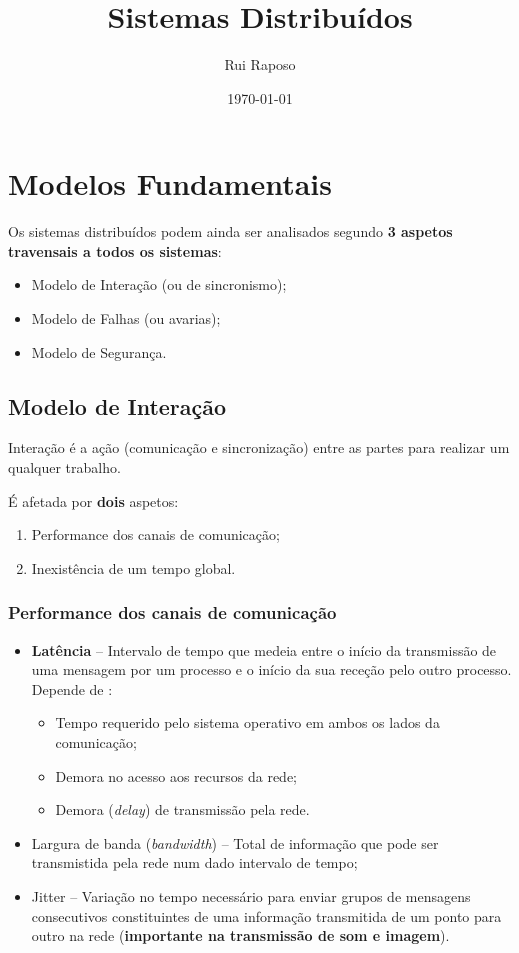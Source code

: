\documentclass{article}
\date{\today \\ \currenttime}
\title{Sistemas Distribuídos}
\author{Rui Raposo}
\begin{document}
\maketitle

\section{Modelos Fundamentais}

Os sistemas distribuídos podem ainda ser analisados segundo \textbf{3 aspetos travensais a todos os sistemas}:

\begin{itemize}
	\item Modelo de Interação (ou de sincronismo);
	\item Modelo de Falhas (ou avarias);
	\item Modelo de Segurança.
\end{itemize}

\subsection{Modelo de Interação}

Interação é a ação (comunicação e sincronização) entre as partes para realizar um qualquer trabalho.

É afetada por \textbf{dois} aspetos:
\begin{enumerate}
	\item Performance dos canais de comunicação;
	\item Inexistência de um tempo global.
\end{enumerate}

\subsubsection{Performance dos canais de comunicação}

\begin{itemize}
	\item \textbf{Latência} -- Intervalo de tempo que medeia entre o início da transmissão de uma mensagem por um processo e o início da sua receção pelo outro processo.
	\\
	Depende de :
		\begin{itemize}
			\item Tempo requerido pelo sistema operativo em ambos os lados da comunicação;
			\item Demora no acesso aos recursos da rede;
			\item Demora (\textit{delay}) de transmissão pela rede.
		\end{itemize}
	\item Largura de banda (\textit{bandwidth}) -- Total de informação que pode ser transmistida pela rede num dado intervalo de tempo;
	\item Jitter -- Variação no tempo necessário para enviar grupos de mensagens consecutivos constituintes de uma informação transmitida de um ponto para outro na rede (\textbf{importante na transmissão de som e imagem}).
\end{itemize}
\end{document}
